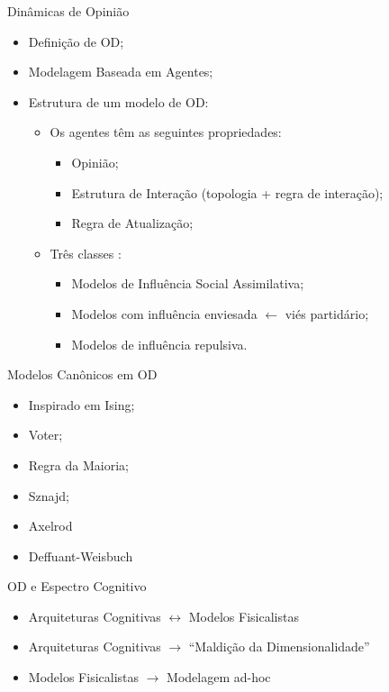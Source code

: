 \documentclass{beamer}
\begin{document}
\begin{frame}{Dinâmicas de Opinião}
  \begin{itemize}
  \item Definição de OD;
  \item Modelagem Baseada em Agentes;
  \item Estrutura de um modelo de OD:
    \begin{itemize}
    \item Os agentes têm as seguintes propriedades:

      \begin{itemize}
      \item Opinião;
      \item Estrutura de Interação (topologia + regra de interação);
      \item Regra de Atualização;
      \end{itemize}
    \item Três classes \cite{flache2017}:
      \begin{itemize}
      \item Modelos de Influência Social Assimilativa;
      \item Modelos com influência enviesada  \(\leftarrow\) viés partidário;
      \item Modelos de influência repulsiva.
      \end{itemize}
      
    \end{itemize}
  \end{itemize}
\end{frame}

\begin{frame}{Modelos Canônicos em OD}
  \begin{itemize}
  \item Inspirado em Ising;
  \item Voter;
  \item Regra da Maioria;
  \item Sznajd;
  \item Axelrod
  \item Deffuant-Weisbuch
  \end{itemize}
\end{frame}

\begin{frame}{OD e Espectro Cognitivo }
  \begin{itemize}
  \item Arquiteturas Cognitivas \(\longleftrightarrow\) Modelos Fisicalistas
  \item Arquiteturas Cognitivas \(\rightarrow\) ``Maldição da Dimensionalidade''
    \cite{de2005computational}
  \item Modelos Fisicalistas \(\rightarrow\) Modelagem ad-hoc
  \end{itemize}
\end{frame}
\end{document}
